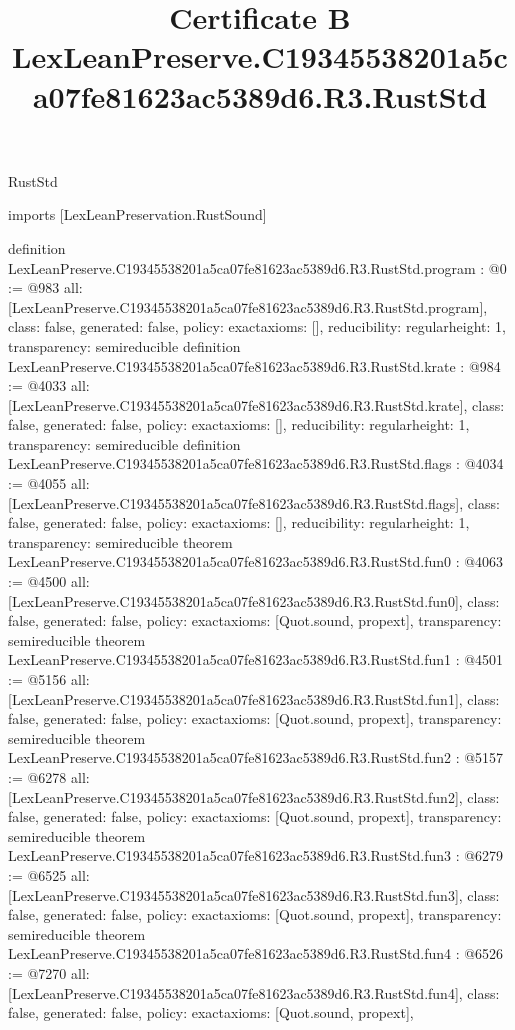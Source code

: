 \begin{lexlean}{RustStd}
\title{Certificate B LexLeanPreserve.C19345538201a5ca07fe81623ac5389d6.R3.RustStd}
\begin{coremodule}
imports [LexLeanPreservation.RustSound]

definition LexLeanPreserve.C19345538201a5ca07fe81623ac5389d6.R3.RustStd.program : @0 := @983 {
  all: [LexLeanPreserve.C19345538201a5ca07fe81623ac5389d6.R3.RustStd.program],
  class: false,
  generated: false,
  policy: exact{axioms: []},
  reducibility: regular{height: 1},
  transparency: semireducible
}
definition LexLeanPreserve.C19345538201a5ca07fe81623ac5389d6.R3.RustStd.krate : @984 := @4033 {
  all: [LexLeanPreserve.C19345538201a5ca07fe81623ac5389d6.R3.RustStd.krate],
  class: false,
  generated: false,
  policy: exact{axioms: []},
  reducibility: regular{height: 1},
  transparency: semireducible
}
definition LexLeanPreserve.C19345538201a5ca07fe81623ac5389d6.R3.RustStd.flags : @4034 := @4055 {
  all: [LexLeanPreserve.C19345538201a5ca07fe81623ac5389d6.R3.RustStd.flags],
  class: false,
  generated: false,
  policy: exact{axioms: []},
  reducibility: regular{height: 1},
  transparency: semireducible
}
theorem LexLeanPreserve.C19345538201a5ca07fe81623ac5389d6.R3.RustStd.fun0 : @4063 := @4500 {
  all: [LexLeanPreserve.C19345538201a5ca07fe81623ac5389d6.R3.RustStd.fun0],
  class: false,
  generated: false,
  policy: exact{axioms: [Quot.sound, propext]},
  transparency: semireducible
}
theorem LexLeanPreserve.C19345538201a5ca07fe81623ac5389d6.R3.RustStd.fun1 : @4501 := @5156 {
  all: [LexLeanPreserve.C19345538201a5ca07fe81623ac5389d6.R3.RustStd.fun1],
  class: false,
  generated: false,
  policy: exact{axioms: [Quot.sound, propext]},
  transparency: semireducible
}
theorem LexLeanPreserve.C19345538201a5ca07fe81623ac5389d6.R3.RustStd.fun2 : @5157 := @6278 {
  all: [LexLeanPreserve.C19345538201a5ca07fe81623ac5389d6.R3.RustStd.fun2],
  class: false,
  generated: false,
  policy: exact{axioms: [Quot.sound, propext]},
  transparency: semireducible
}
theorem LexLeanPreserve.C19345538201a5ca07fe81623ac5389d6.R3.RustStd.fun3 : @6279 := @6525 {
  all: [LexLeanPreserve.C19345538201a5ca07fe81623ac5389d6.R3.RustStd.fun3],
  class: false,
  generated: false,
  policy: exact{axioms: [Quot.sound, propext]},
  transparency: semireducible
}
theorem LexLeanPreserve.C19345538201a5ca07fe81623ac5389d6.R3.RustStd.fun4 : @6526 := @7270 {
  all: [LexLeanPreserve.C19345538201a5ca07fe81623ac5389d6.R3.RustStd.fun4],
  class: false,
  generated: false,
  policy: exact{axioms: [Quot.sound, propext]},
}
\end{coremodule}
\end{lexlean}
